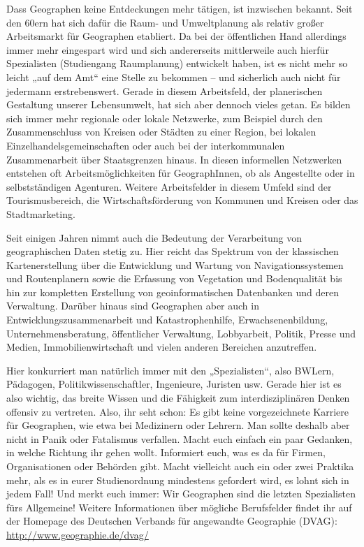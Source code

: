 Dass Geographen keine Entdeckungen mehr tätigen, ist inzwischen bekannt. Seit den 60ern hat sich dafür die Raum- und Umweltplanung als relativ großer Arbeitsmarkt für Geographen etabliert. Da bei der öffentlichen Hand allerdings immer mehr eingespart wird und sich andererseits mittlerweile auch hierfür Spezialisten (Studiengang Raumplanung) entwickelt haben, ist es nicht mehr so leicht „auf dem Amt“ eine Stelle zu bekommen – und sicherlich auch nicht für jedermann erstrebenswert. Gerade in diesem Arbeitsfeld, der planerischen Gestaltung unserer Lebensumwelt, hat sich aber dennoch vieles getan. Es bilden sich immer mehr regionale oder lokale Netzwerke, zum Beispiel durch den Zusammenschluss von Kreisen oder Städten zu einer Region, bei lokalen Einzelhandelsgemeinschaften oder auch bei der interkommunalen Zusammenarbeit über Staatsgrenzen hinaus. In diesen informellen Netzwerken entstehen oft Arbeitsmöglichkeiten für GeographInnen, ob als Angestellte oder in selbstständigen Agenturen. Weitere Arbeitsfelder in diesem Umfeld sind der Tourismusbereich, die Wirtschaftsförderung von Kommunen und Kreisen oder das Stadtmarketing.

Seit einigen Jahren nimmt auch die Bedeutung der Verarbeitung von geographischen Daten stetig zu. Hier reicht das Spektrum von der klassischen Kartenerstellung über die Entwicklung und Wartung von Navigationssystemen und Routenplanern sowie die Erfassung von Vegetation und Bodenqualität bis hin zur kompletten Erstellung von geoinformatischen Datenbanken und deren Verwaltung. Darüber hinaus sind Geographen aber auch in Entwicklungszusammenarbeit und Katastrophenhilfe, Erwachsenenbildung, Unternehmensberatung, öffentlicher Verwaltung, Lobbyarbeit, Politik, Presse und Medien, Immobilienwirtschaft und vielen anderen Bereichen anzutreffen.

Hier konkurriert man natürlich immer mit den „Spezialisten“, also BWLern, Pädagogen, Politikwissenschaftler, Ingenieure, Juristen usw. Gerade hier ist es also wichtig, das breite Wissen und die Fähigkeit zum interdisziplinären Denken offensiv zu vertreten. Also, ihr seht schon: Es gibt keine vorgezeichnete Karriere für Geographen, wie etwa bei Medizinern oder Lehrern. Man sollte deshalb aber nicht in Panik oder Fatalismus verfallen. Macht euch einfach ein paar Gedanken, in welche Richtung ihr gehen wollt. Informiert euch, was es da für Firmen, Organisationen oder Behörden gibt. Macht vielleicht auch ein oder zwei Praktika mehr, als es in eurer Studienordnung mindestens gefordert wird, es lohnt sich in jedem Fall! Und merkt euch immer: Wir Geographen sind die letzten Spezialisten fürs Allgemeine! Weitere Informationen über mögliche Berufsfelder ﬁndet ihr auf der Homepage des Deutschen Verbands für angewandte Geographie (DVAG): \url{http://www.geographie.de/dvag/}

